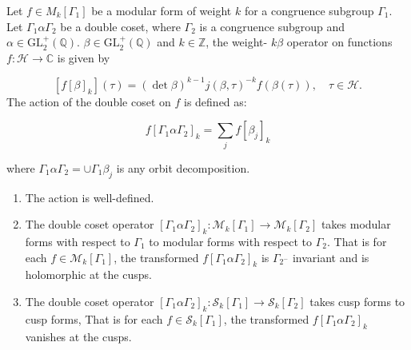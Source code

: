 \begin{definition}
    Let $f \in M_{k}\left[\Gamma_{1}\right]$ be a modular form of weight $k$ for a congruence subgroup $\Gamma_{1}$. Let $\Gamma_{1} \alpha \Gamma_{2}$ be a double coset, where $\Gamma_{2}$ is a congruence subgroup and $\alpha \in \mathrm{GL}_{2}^{+}(\mathbb{Q})$. $\beta \in \mathrm{GL}_{2}^{+}(\mathbb{Q})$ and $k \in \mathbb{Z}$, the weight- $k \beta$ operator on functions $f: \mathcal{H} \longrightarrow \mathbb{C}$ is given by

$$
\left[f[\beta]_{k}\right](\tau)=(\operatorname{det} \beta)^{k-1} j(\beta, \tau)^{-k} f(\beta(\tau)), \quad \tau \in \mathcal{H}.
$$
 The action of the double coset on $f$ is defined as:

$$
f\left[\Gamma_{1} \alpha \Gamma_{2}\right]_{k}=\sum_{j} f\left[\beta_{j}\right]_{k}
$$

 where $\Gamma_{1} \alpha \Gamma_{2}=\cup \Gamma_{1} \beta_{j}$ is any orbit decomposition.
\end{definition}
\begin{proposition}
    \begin{enumerate}
        \item The action is well-defined.
        \item The double coset operator $\left[\Gamma_{1} \alpha \Gamma_{2}\right]_{k}: \mathcal{M}_{k}\left[\Gamma_{1}\right] \longrightarrow \mathcal{M}_{k}\left[\Gamma_{2}\right]
$ takes modular forms with respect to $\Gamma_{1}$ to modular forms with respect to $\Gamma_{2}$. That is for each $f \in \mathcal{M}_{k}\left[\Gamma_{1}\right]$, the transformed $f\left[\Gamma_{1} \alpha \Gamma_{2}\right]_{k}$ is $\Gamma_{2^{-}}$ invariant and is holomorphic at the cusps. 

\item The double coset operator  $
\left[\Gamma_{1} \alpha \Gamma_{2}\right]_{k}: \mathcal{S}_{k}\left[\Gamma_{1}\right] \longrightarrow \mathcal{S}_{k}\left[\Gamma_{2}\right]
$ takes cusp forms to cusp forms,
That is for each $f \in \mathcal{S}_{k}\left[\Gamma_{1}\right]$, the transformed $f\left[\Gamma_{1} \alpha \Gamma_{2}\right]_{k}$ vanishes at the cusps.

    \end{enumerate}
\end{proposition}
